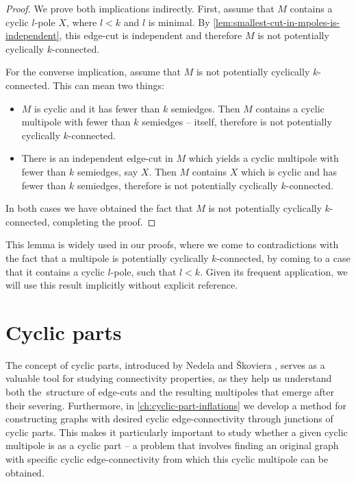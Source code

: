 \documentclass[12pt, twoside]{book}
\begin{document}
\begin{proof}
	We prove both implications indirectly. First, assume that $M$ contains a cyclic \mbox{$l$-pole} $X$, where $l<k$ and $l$ is minimal. By \cref{lem:smallest-cut-in-mpoles-is-independent}, this edge-cut is independent and therefore $M$ is not potentially cyclically $k$-connected.
	
	For the converse implication, assume that $M$ is not potentially cyclically $k$-connected. This can mean two things:
	\begin{itemize}
		\item $M$ is cyclic and it has fewer than $k$ semiedges. Then $M$ contains a cyclic multipole with fewer than $k$ semiedges -- itself, therefore is not potentially cyclically \mbox{$k$-connected}.
		\item There is an independent edge-cut in $M$ which yields a cyclic multipole with fewer than $k$ semiedges, say $X$. Then $M$ contains $X$ which is cyclic and has fewer than $k$ semiedges, therefore is not potentially cyclically $k$-connected.
	\end{itemize}
	
	In both cases we have obtained the fact that $M$ is not potentially cyclically $k$-connected, completing the proof.
\end{proof}

This lemma is widely used in our proofs, where we come to contradictions with the fact that a multipole is potentially cyclically $k$-connected, by coming to a case that it contains a cyclic $l$-pole, such that $l<k$. Given its frequent application, we will use this result implicitly without explicit reference.

\section{Cyclic parts}\label{sec:cyclic-part-results}


The concept of cyclic parts, introduced by Nedela and Škoviera \cite{atoms-of-cyclic}, serves as a valuable tool for studying connectivity properties, as they help us understand both the~structure of edge-cuts and the resulting multipoles that emerge after their severing. Furthermore, in \cref{ch:cyclic-part-inflations} we develop a method for constructing graphs with desired cyclic \mbox{edge-connectivity} through junctions of cyclic parts. This makes it particularly important to study whether a given cyclic multipole is as a cyclic part -- a problem that involves finding an original graph with specific cyclic \mbox{edge-connectivity} from which this cyclic multipole can be obtained.
\end{document}
